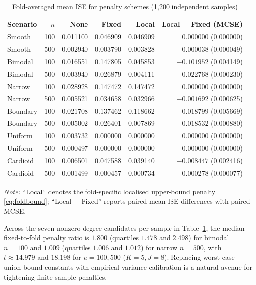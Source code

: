 \begin{table}[htbp]
\centering
\caption{Fold-averaged mean ISE for penalty schemes (1,200 independent samples)}\label{tab:t4}
\small
\setlength{\tabcolsep}{4pt}
\begin{tabular}{lrrrrr}
\toprule
Scenario & \(n\) & None & Fixed & Local & Local \(-\) Fixed (MCSE) \\
\midrule
Smooth & 100 & 0.011100 & 0.046909 & 0.046909 & 0.000000 (0.000000) \\
Smooth & 500 & 0.002940 & 0.003790 & 0.003828 & 0.000038 (0.000049) \\
Bimodal & 100 & 0.016551 & 0.147805 & 0.045853 & \(-0.101952\) (0.004149) \\
Bimodal & 500 & 0.003940 & 0.026879 & 0.004111 & \(-0.022768\) (0.000230) \\
Narrow & 100 & 0.028928 & 0.147472 & 0.147472 & 0.000000 (0.000000) \\
Narrow & 500 & 0.005521 & 0.034658 & 0.032966 & \(-0.001692\) (0.000625) \\
Boundary & 100 & 0.021708 & 0.137462 & 0.118662 & \(-0.018799\) (0.005669) \\
Boundary & 500 & 0.005002 & 0.026401 & 0.007869 & \(-0.018532\) (0.000880) \\
Uniform & 100 & 0.003732 & 0.000000 & 0.000000 & 0.000000 (0.000000) \\
Uniform & 500 & 0.000497 & 0.000000 & 0.000000 & 0.000000 (0.000000) \\
Cardioid & 100 & 0.006501 & 0.047588 & 0.039140 & \(-0.008447\) (0.002416) \\
Cardioid & 500 & 0.001499 & 0.000457 & 0.000734 & 0.000278 (0.000077) \\
\bottomrule
\end{tabular}

\vspace{0.3em}
\footnotesize\textit{Note:} ``Local'' denotes the fold-specific localised upper-bound penalty \eqref{eq:foldbound}; ``Local \(-\) Fixed'' reports paired mean ISE differences with paired MCSE.
\end{table}

Across the seven nonzero-degree candidates per sample in Table~\ref{tab:t4}, the median fixed-to-fold penalty ratio is \(1.800\) (quartiles \(1.478\) and \(2.498\)) for bimodal \(n=100\) and \(1.009\) (quartiles \(1.006\) and \(1.012\)) for narrow \(n=500\), with \(t\approx 14.979\) and \(18.198\) for \(n=100,500\) (\(K=5,J=8\)). Replacing worst-case union-bound constants with empirical-variance calibration is a natural avenue for tightening finite-sample penalties.

